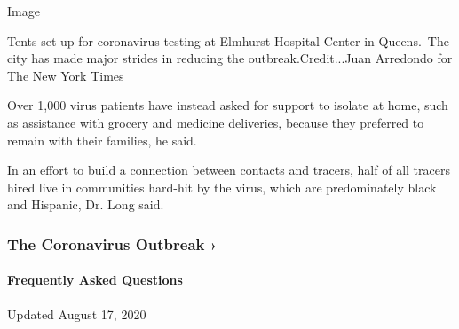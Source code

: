 Image

Tents set up for coronavirus testing at Elmhurst Hospital Center in
Queens.~The city has made major strides in reducing the
outbreak.Credit...Juan Arredondo for The New York Times

Over 1,000 virus patients have instead asked for support to isolate at
home, such as assistance with grocery and medicine deliveries, because
they preferred to remain with their families, he said.

In an effort to build a connection between contacts and tracers, half of
all tracers hired live in communities hard-hit by the virus, which are
predominately black and Hispanic, Dr. Long said.

\href{https://www.nytimes3xbfgragh.onion/news-event/coronavirus?action=click\&pgtype=Article\&state=default\&region=MAIN_CONTENT_3\&context=storylines_faq}{}

\hypertarget{the-coronavirus-outbreak-}{%
\subsubsection{The Coronavirus Outbreak
›}\label{the-coronavirus-outbreak-}}

\hypertarget{frequently-asked-questions}{%
\paragraph{Frequently Asked
Questions}\label{frequently-asked-questions}}

Updated August 17, 2020

